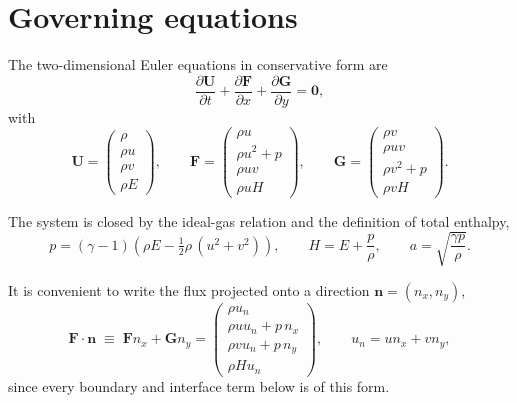 \documentclass[11pt,a4paper]{article}
\newcommand{\vect}[1]{\boldsymbol{#1}}
\newcommand{\Uvec}{\vect{U}}
\newcommand{\Fvec}{\vect{F}}
\newcommand{\nvec}{\vect{n}}
\begin{document}
\section{Governing equations}

The two-dimensional Euler equations in conservative form are
\begin{equation}
  \frac{\partial \Uvec}{\partial t}
  + \frac{\partial \Fvec}{\partial x}
  + \frac{\partial \vect{G}}{\partial y} = \vect{0},
  \label{eq:euler}
\end{equation}
with
\begin{equation}
  \Uvec =
  \begin{pmatrix} \rho \\ \rho u \\ \rho v \\ \rho E \end{pmatrix},
  \qquad
  \Fvec =
  \begin{pmatrix} \rho u \\ \rho u^{2} + p \\ \rho u v \\ \rho u H \end{pmatrix},
  \qquad
  \vect{G} =
  \begin{pmatrix} \rho v \\ \rho u v \\ \rho v^{2} + p \\ \rho v H \end{pmatrix}.
\end{equation}

The system is closed by the ideal-gas relation and the definition of total
enthalpy,
\begin{equation}
  p = (\gamma - 1)\left(\rho E - \tfrac{1}{2}\rho\,(u^{2} + v^{2})\right),
  \qquad
  H = E + \frac{p}{\rho},
  \qquad
  a = \sqrt{\frac{\gamma p}{\rho}} .
  \label{eq:closure}
\end{equation}

It is convenient to write the flux projected onto a direction $\nvec = (n_x, n_y)$,
\begin{equation}
  \Fvec\!\cdot\!\nvec \;\equiv\; \Fvec n_x + \vect{G} n_y
  =
  \begin{pmatrix}
    \rho u_n \\ \rho u u_n + p\,n_x \\ \rho v u_n + p\,n_y \\ \rho H u_n
  \end{pmatrix},
  \qquad u_n = u n_x + v n_y ,
  \label{eq:normalflux}
\end{equation}
since every boundary and interface term below is of this form.
\end{document}
